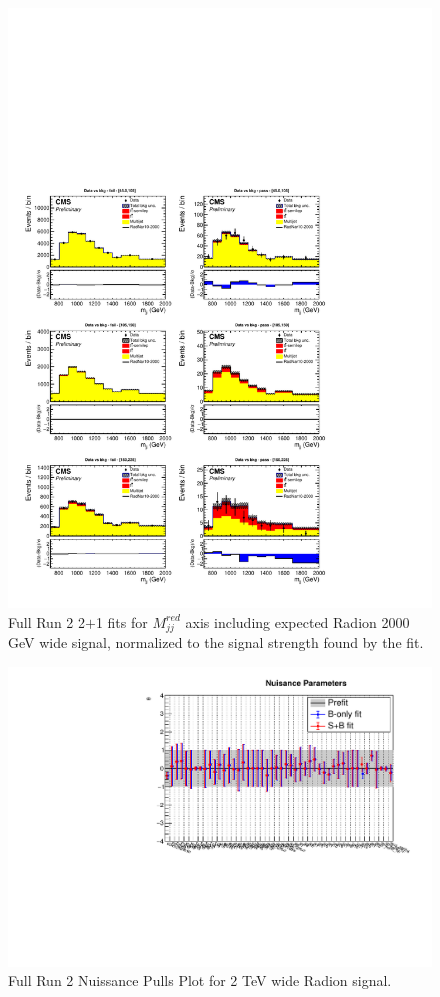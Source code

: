 \begin{figure}[!htb]
	\centering
	\includegraphics[width=1\textwidth]{Figures/postfit_projy_fits_21wide.pdf}
	\caption{Full Run 2 2$+$1 fits for $M_{jj}^{red}$ axis including expected Radion 2000 GeV wide signal, normalized to the signal strength found by the fit.}
	\label{fig:21mjjwide}
\end{figure}
\begin{figure}[!htb]
	\centering
	\includegraphics[width=1\textwidth]{Figures/nuisance_pulls_wide.pdf}
	\caption{Full Run 2 Nuissance Pulls Plot for 2 TeV wide Radion signal.}
	\label{fig:nuissanceswide}
\end{figure}

